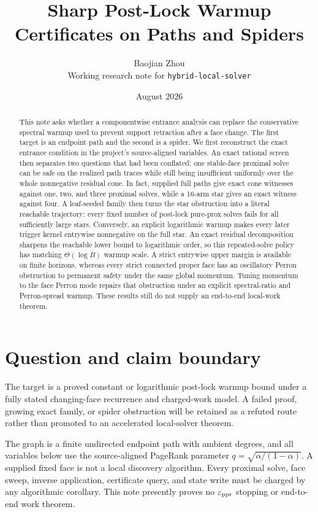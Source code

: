 \documentclass[11pt]{article}
\title{Sharp Post-Lock Warmup Certificates on Paths and Spiders}
\author{Baojian Zhou\\
\small Working research note for \texttt{hybrid-local-solver}}
\date{August 2026}
\begin{document}
\maketitle

\begin{abstract}
This note asks whether a componentwise entrance analysis can replace the
conservative spectral warmup used to prevent support retraction after a face
change.  The first target is an endpoint path and the second is a spider.
We first reconstruct the exact entrance condition in the project's
source-aligned variables.  An exact rational screen then separates two
questions that had been conflated: one stable-face proximal solve can be safe
on the realized path traces while still being insufficient uniformly over the
whole nonnegative residual cone.  In fact, supplied full paths give exact
cone witnesses against one, two, and three proximal solves, while a 16-arm
star gives an exact witness against four.  A leaf-seeded family then turns the
star obstruction into a literal reachable trajectory: every fixed number of
post-lock pure-prox solves fails for all sufficiently large stars.  Conversely,
an explicit logarithmic warmup makes every later trigger kernel entrywise
nonnegative on the full star.  An exact residual decomposition sharpens the
reachable lower bound to logarithmic order, so this repeated-solve policy has
matching $\Theta(\log B)$ warmup scale.  A strict entrywise upper margin is
available on finite horizons, whereas every strict connected proper face has
an oscillatory Perron obstruction to permanent safety under the same global
momentum.  Tuning momentum to the face Perron mode repairs that obstruction
under an explicit spectral-ratio and Perron-spread warmup.  These results still
do not supply an end-to-end local-work theorem.
\end{abstract}



\section{Question and claim boundary}

The target is a proved constant or logarithmic post-lock warmup bound under a
fully stated changing-face recurrence and charged-work model.  A failed proof,
growing exact family, or spider obstruction will be retained as a refuted
route rather than promoted to an accelerated local-solver theorem.

The graph is a finite undirected endpoint path with ambient degrees, and all
variables below use the source-aligned PageRank parameter
\(q=\sqrt{\alpha/(1-\alpha)}\).  A supplied fixed face is not a local
discovery algorithm.  Every proximal solve, face sweep, inverse application,
certificate query, and state write must be charged by any algorithmic
corollary.  This note presently proves no \(\varepsilon_{\rm ppr}\) stopping
or end-to-end work theorem.
\end{document}
